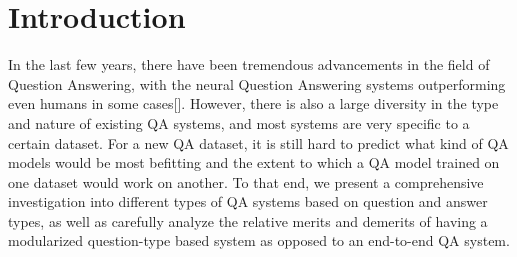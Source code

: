 


\section{Introduction}


In the last few years, there have been tremendous advancements in the field of Question Answering, with the neural Question Answering systems outperforming even humans in some cases[\cite{msmarco}]. However, there is also a large diversity in the type and nature of existing QA systems, and most systems are very specific to a certain dataset. For a new QA dataset, it is still hard to predict what kind of QA models would be most befitting and the extent to which a QA model trained on one dataset would work on another. To that end, we present a comprehensive investigation into different types of QA systems based on question and answer types, as well as carefully analyze the relative merits and demerits of having a modularized question-type based system as opposed to an end-to-end QA system. 

